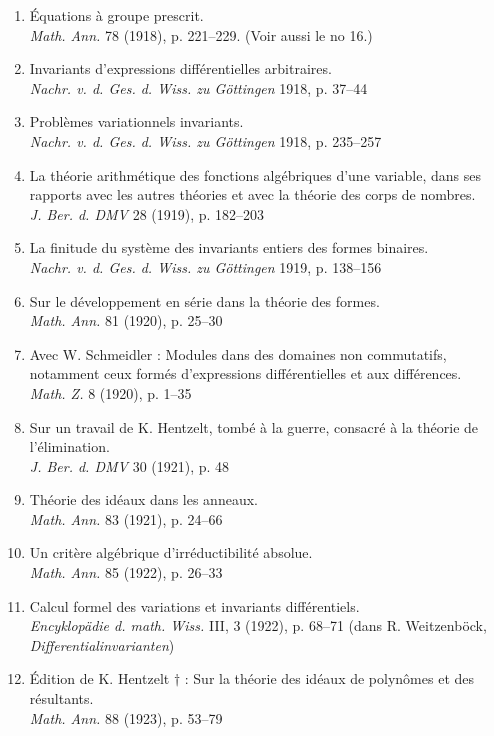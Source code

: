 \begin{enumerate}
\emph{Math. Ann.} 77 (1916), p. 536--545
\item Équations à groupe prescrit.\\
\emph{Math. Ann.} 78 (1918), p. 221--229. (Voir aussi le no 16.)
\item Invariants d'expressions différentielles arbitraires.\\
\emph{Nachr. v. d. Ges. d. Wiss. zu Göttingen} 1918, p. 37--44
\item Problèmes variationnels invariants.\\
\emph{Nachr. v. d. Ges. d. Wiss. zu Göttingen} 1918, p. 235--257
\item La théorie arithmétique des fonctions algébriques d'une variable, dans ses rapports avec les autres théories et avec la théorie des corps de nombres.\\
\emph{J. Ber. d. DMV} 28 (1919), p. 182--203
\item La finitude du système des invariants entiers des formes binaires.\\
\emph{Nachr. v. d. Ges. d. Wiss. zu Göttingen} 1919, p. 138--156
\item Sur le développement en série dans la théorie des formes.\\
\emph{Math. Ann.} 81 (1920), p. 25--30
\item Avec W. Schmeidler : Modules dans des domaines non commutatifs, notamment ceux formés d'expressions différentielles et aux différences.\\
\emph{Math. Z.} 8 (1920), p. 1--35
\item Sur un travail de K. Hentzelt, tombé à la guerre, consacré à la théorie de l'élimination.\\
\emph{J. Ber. d. DMV} 30 (1921), p. 48
\item Théorie des idéaux dans les anneaux.\\
\emph{Math. Ann.} 83 (1921), p. 24--66
\item Un critère algébrique d'irréductibilité absolue.\\
\emph{Math. Ann.} 85 (1922), p. 26--33
\item Calcul formel des variations et invariants différentiels.\\
\emph{Encyklopädie d. math. Wiss.} III, 3 (1922), p. 68--71 (dans R. Weitzenböck, \emph{Differentialinvarianten})
\item Édition de K. Hentzelt $\dagger$ : Sur la théorie des idéaux de polynômes et des résultants.\\
\emph{Math. Ann.} 88 (1923), p. 53--79

\end{enumerate}
